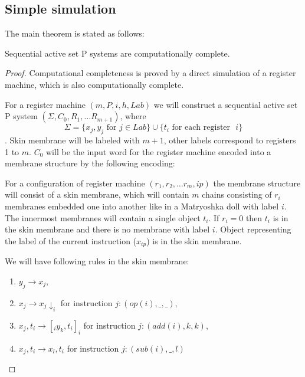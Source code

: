 \documentclass[submission,copyright,creativecommons]{../lib/lncs/llncs}
\begin{document}

\subsection{Simple simulation} %
\label{sub:simple_simulation}

The main theorem is stated as follows:

\begin{theorem}
  Sequential active set P systems are computationally complete.
\end{theorem}

\begin{proof}
  Computational completeness is proved by a direct simulation of a register machine, which is also computationally complete.

  For a register machine $(m,P,i,h,Lab)$ we will construct a sequential active set P system $(\Sigma, C_0, R_1, \ldots R_{m+1})$, where $$\Sigma = \{x_j, y_j \text{~for~} j\in Lab\}\cup\{t_i \text{~for each register ~}i\}$$. Skin membrane will be labeled with $m+1$, other labels correspond to registers 1 to $m$. $C_0$ will be the input word for the register machine encoded into a membrane structure by the following encoding: 

  For a configuration of register machine $(r_1, r_2, \ldots r_m, ip)$ the membrane structure will consist of a skin membrane, which will contain $m$ chains consisting of $r_i$ membranes embedded one into another like in a Matryoshka doll with label $i$. The innermost membranes will contain a single object $t_i$. If $r_i = 0$ then $t_i$ is in the skin membrane and there is no membrane with label $i$. Object representing the label of the current instruction ($x_{ip}$) is in the skin membrane.

  We will have following rules in the skin membrane:
  \begin{enumerate}
    \item\label{simple_skin_next_instruction} $y_j \rightarrow x_j$,
    \item\label{simple_skin_send_down} $x_j \rightarrow x_j\downarrow_{i}$ for instruction $j: (op(i), \_, \_)$,
    \item\label{simple_skin_create} $x_j, t_i \rightarrow [_i y_k, t_i ]_i$ for instruction $j: (add(i), k, k)$,
    \item\label{simple_skin_sub_empty} $x_j, t_i \rightarrow x_l, t_i$ for instruction $j: (sub(i), \_, l)$
  \end{enumerate}


\end{proof}
\end{document}
